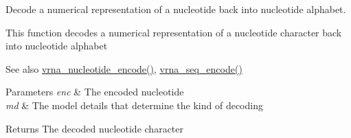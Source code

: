 Decode a numerical representation of a nucleotide back into nucleotide alphabet. 

This function decodes a numerical representation of a nucleotide character back into nucleotide alphabet

\begin{DoxySeeAlso}{See also}
\mbox{\hyperlink{group__alphabet__utils_gac12bf00123f88621c9be847b0879c1fb}{vrna\+\_\+nucleotide\+\_\+encode()}}, \mbox{\hyperlink{group__alphabet__utils_ga636e7d6f888fd639587296a5eddea660}{vrna\+\_\+seq\+\_\+encode()}}
\end{DoxySeeAlso}

\begin{DoxyParams}{Parameters}
{\em enc} & The encoded nucleotide \\
\hline
{\em md} & The model details that determine the kind of decoding \\
\hline
\end{DoxyParams}
\begin{DoxyReturn}{Returns}
The decoded nucleotide character 
\end{DoxyReturn}
